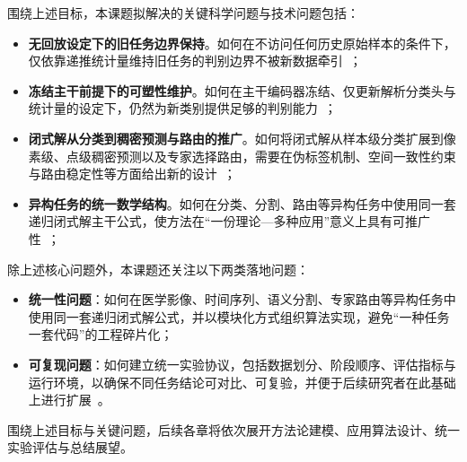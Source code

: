 围绕上述目标，本课题拟解决的关键科学问题与技术问题包括：
\begin{itemize}
    \item \textbf{无回放设定下的旧任务边界保持}。如何在不访问任何历史原始样本的条件下，仅依靠递推统计量维持旧任务的判别边界不被新数据牵引~\citep{zhuang2022acil,fang2024air}；
    \item \textbf{冻结主干前提下的可塑性维护}。如何在主干编码器冻结、仅更新解析分类头与统计量的设定下，仍然为新类别提供足够的判别能力~\citep{GKEAL_Zhuang_CVPR2023,GACL_Zhuang_NeurIPS2024}；
    \item \textbf{闭式解从分类到稠密预测与路由的推广}。如何将闭式解从样本级分类扩展到像素级、点级稠密预测以及专家选择路由，需要在伪标签机制、空间一致性约束与路由稳定性等方面给出新的设计~\citep{cermelli2020mib,li2025cfsseg,li2026cfrouter}；
    \item \textbf{异构任务的统一数学结构}。如何在分类、分割、路由等异构任务中使用同一套递归闭式解主干公式，使方法在“一份理论—多种应用”意义上具有可推广性~\citep{zhuang2024dsal}；
\end{itemize}

除上述核心问题外，本课题还关注以下两类落地问题：
\begin{itemize}
    \item \textbf{统一性问题}：如何在医学影像、时间序列、语义分割、专家路由等异构任务中使用同一套递归闭式解公式，并以模块化方式组织算法实现，避免“一种任务一套代码”的工程碎片化；
    \item \textbf{可复现问题}：如何建立统一实验协议，包括数据划分、阶段顺序、评估指标与运行环境，以确保不同任务结论可对比、可复验，并便于后续研究者在此基础上进行扩展~\citep{wang2024survey,qiao2024tscil}。
\end{itemize}

围绕上述目标与关键问题，后续各章将依次展开方法论建模、应用算法设计、统一实验评估与总结展望。
